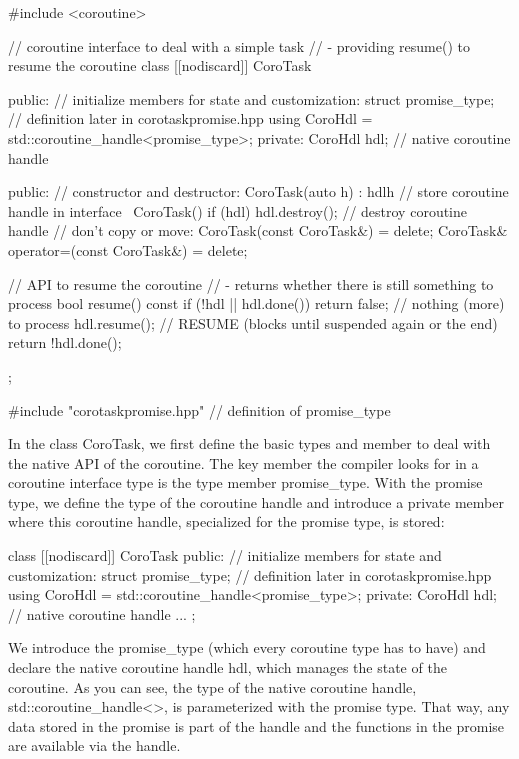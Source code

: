 \begin{cpp}
#include <coroutine>

// coroutine interface to deal with a simple task
// - providing resume() to resume the coroutine
class [[nodiscard]] CoroTask {
public:
	// initialize members for state and customization:
	struct promise_type; // definition later in corotaskpromise.hpp
	using CoroHdl = std::coroutine_handle<promise_type>;
	private:
	CoroHdl hdl; // native coroutine handle
	
public:
	// constructor and destructor:
	CoroTask(auto h)
	: hdl{h} { // store coroutine handle in interface
	}
	~CoroTask() {
		if (hdl) {
			hdl.destroy(); // destroy coroutine handle
		}
	}
	// don’t copy or move:
	CoroTask(const CoroTask&) = delete;
	CoroTask& operator=(const CoroTask&) = delete;
	
	// API to resume the coroutine
	// - returns whether there is still something to process
	bool resume() const {
		if (!hdl || hdl.done()) {
			return false; // nothing (more) to process
		}
		hdl.resume(); // RESUME (blocks until suspended again or the end)
		return !hdl.done();
	}
};

#include "corotaskpromise.hpp" // definition of promise_type
\end{cpp}

In the class CoroTask, we first define the basic types and member to deal with the native API of the coroutine. The key member the compiler looks for in a coroutine interface type is the type member promise\_type. With the promise type, we define the type of the coroutine handle and introduce a private member where this coroutine handle, specialized for the promise type, is stored:

\begin{cpp}
class [[nodiscard]] CoroTask {
public:
	// initialize members for state and customization:
	struct promise_type; // definition later in corotaskpromise.hpp
	using CoroHdl = std::coroutine_handle<promise_type>;
private:
	CoroHdl hdl; // native coroutine handle
	...
};
\end{cpp}

We introduce the promise\_type (which every coroutine type has to have) and declare the native coroutine handle hdl, which manages the state of the coroutine. As you can see, the type of the native coroutine handle, std::coroutine\_handle<>, is parameterized with the promise type. That way, any data stored in the promise is part of the handle and the functions in the promise are available via the handle.

